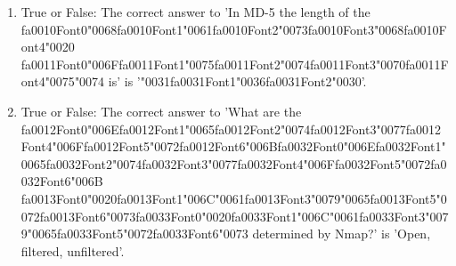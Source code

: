 \documentclass[12pt]{article}
\begin{document}
\begin{enumerate}[label=\arabic*.]
\item True or False: The correct answer to 'In MD-5 the length of the {\csname fa0010Font0\endcsname\char"0068}{\csname fa0010Font1\endcsname\char"0061}{\csname fa0010Font2\endcsname\char"0073}{\csname fa0010Font3\endcsname\char"0068}{\csname fa0010Font4\endcsname\char"0020} {\csname fa0011Font0\endcsname\char"006F}{\csname fa0011Font1\endcsname\char"0075}{\csname fa0011Font2\endcsname\char"0074}{\csname fa0011Font3\endcsname\char"0070}{\csname fa0011Font4\endcsname\char"0075}{\char"0074} is' is '{\char"0031}{\csname fa0031Font1\endcsname\char"0036}{\csname fa0031Font2\endcsname\char"0030}'.
\item True or False: The correct answer to 'What are the {\csname fa0012Font0\endcsname\char"006E}{\csname fa0012Font1\endcsname\char"0065}{\csname fa0012Font2\endcsname\char"0074}{\csname fa0012Font3\endcsname\char"0077}{\csname fa0012Font4\endcsname\char"006F}{\csname fa0012Font5\endcsname\char"0072}{\csname fa0012Font6\endcsname\char"006B}{\csname fa0032Font0\endcsname\char"006E}{\csname fa0032Font1\endcsname\char"0065}{\csname fa0032Font2\endcsname\char"0074}{\csname fa0032Font3\endcsname\char"0077}{\csname fa0032Font4\endcsname\char"006F}{\csname fa0032Font5\endcsname\char"0072}{\csname fa0032Font6\endcsname\char"006B} {\csname fa0013Font0\endcsname\char"0020}{\csname fa0013Font1\endcsname\char"006C}{\char"0061}{\csname fa0013Font3\endcsname\char"0079}{\char"0065}{\csname fa0013Font5\endcsname\char"0072}{\csname fa0013Font6\endcsname\char"0073}{\csname fa0033Font0\endcsname\char"0020}{\csname fa0033Font1\endcsname\char"006C}{\char"0061}{\csname fa0033Font3\endcsname\char"0079}{\char"0065}{\csname fa0033Font5\endcsname\char"0072}{\csname fa0033Font6\endcsname\char"0073} determined by Nmap?' is 'Open, filtered, unfiltered'.

\end{enumerate}
\end{document}
